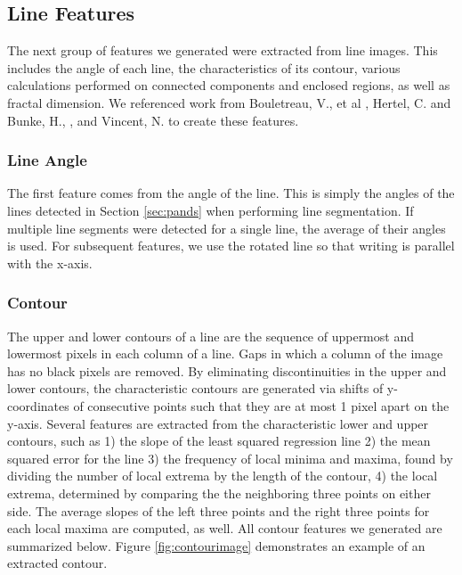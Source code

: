 \documentclass[paper=a4, fontsize=11pt]{scrartcl} %
\numberwithin{equation}{section} %
\numberwithin{figure}{section} %
\numberwithin{table}{section} %
\begin{document}
\subsection{Line Features}
The next group of features we generated were extracted from line
images. This includes the angle of each line, the characteristics of
its contour, various calculations performed on connected components
and enclosed regions, as well as fractal dimension. We referenced work
from Bouletreau, V., et al \cite{SyntheticParameters}, Hertel, C. and
Bunke, H., \cite{NovelFeatures}, and Vincent,
N. \cite{FractalDimensions} to create these features.

\subsubsection{Line Angle}
The first feature comes from the angle of the line. This is simply the
angles of the lines detected in Section \ref{sec:pands} when
performing line segmentation. If multiple line segments were detected
for a single line, the average of their angles is used. For subsequent
features, we use the rotated line so that writing is parallel with the
x-axis.

\subsubsection{Contour}
The upper and lower contours of a line are the sequence of uppermost
and lowermost pixels in each column of a line. Gaps in which a column
of the image has no black pixels are removed. By eliminating
discontinuities in the upper and lower contours, the characteristic
contours are generated via shifts of y-coordinates of consecutive
points such that they are at most 1 pixel apart on the y-axis. Several
features are extracted from the characteristic lower and upper
contours, such as 1) the slope of the least squared regression line 2)
the mean squared error for the line 3) the frequency of local minima
and maxima, found by dividing the number of local extrema by the
length of the contour, 4) the local extrema, determined by comparing
the the neighboring three points on either side. The average slopes of
the left three points and the right three points for each local maxima
are computed, as well.  All contour features we generated are
summarized below. Figure \ref{fig:contourimage} demonstrates an
example of an extracted contour.
\end{document}
